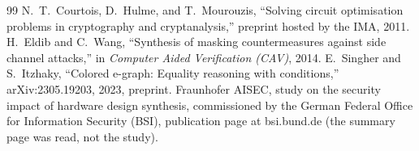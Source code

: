 \documentclass[conference]{IEEEtran}
\begin{document}
\begin{thebibliography}{99}
 N.~T.~Courtois, D.~Hulme, and T.~Mourouzis, ``Solving circuit optimisation problems in cryptography and cryptanalysis,'' preprint hosted by the IMA, 2011. %
 H.~Eldib and C.~Wang, ``Synthesis of masking countermeasures against side channel attacks,'' in \emph{Computer Aided Verification (CAV)}, 2014. %
 E.~Singher and S.~Itzhaky, ``Colored e-graph: Equality reasoning with conditions,'' arXiv:2305.19203, 2023, preprint.
 Fraunhofer AISEC, study on the security impact of hardware design synthesis, commissioned by the German Federal Office for Information Security (BSI), publication page at bsi.bund.de (the summary page was read, not the study). %
\end{thebibliography}
\end{document}
